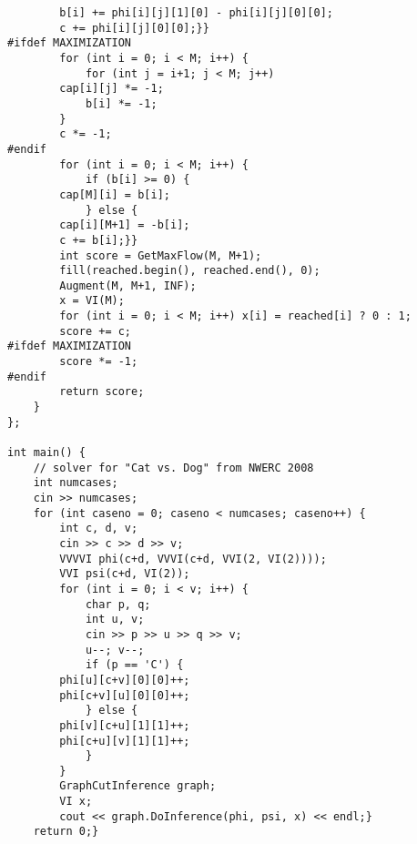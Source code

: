 \documentclass[8pt, oneside]{extarticle}
\begin{document}
\begin{multicols}{3}
\begin{lstlisting}
        b[i] += phi[i][j][1][0] - phi[i][j][0][0];
        c += phi[i][j][0][0];}}
#ifdef MAXIMIZATION
        for (int i = 0; i < M; i++) {
            for (int j = i+1; j < M; j++) 
        cap[i][j] *= -1;
            b[i] *= -1;
        }
        c *= -1;
#endif
        for (int i = 0; i < M; i++) {
            if (b[i] >= 0) {
        cap[M][i] = b[i];
            } else {
        cap[i][M+1] = -b[i];
        c += b[i];}}
        int score = GetMaxFlow(M, M+1);
        fill(reached.begin(), reached.end(), 0);
        Augment(M, M+1, INF);
        x = VI(M);
        for (int i = 0; i < M; i++) x[i] = reached[i] ? 0 : 1;
        score += c;
#ifdef MAXIMIZATION
        score *= -1;
#endif
        return score;
    }
};

int main() {
    // solver for "Cat vs. Dog" from NWERC 2008
    int numcases;
    cin >> numcases;
    for (int caseno = 0; caseno < numcases; caseno++) {
        int c, d, v;
        cin >> c >> d >> v;
        VVVVI phi(c+d, VVVI(c+d, VVI(2, VI(2))));
        VVI psi(c+d, VI(2));
        for (int i = 0; i < v; i++) {
            char p, q;
            int u, v;
            cin >> p >> u >> q >> v;
            u--; v--;
            if (p == 'C') {
        phi[u][c+v][0][0]++;
        phi[c+v][u][0][0]++;
            } else {
        phi[v][c+u][1][1]++;
        phi[c+u][v][1][1]++;
            }
        }
        GraphCutInference graph;
        VI x;
        cout << graph.DoInference(phi, psi, x) << endl;}
    return 0;}
\end{lstlisting}

\end{multicols}
\end{document}
